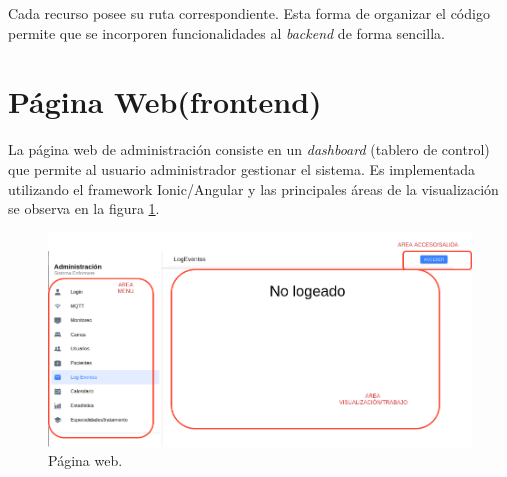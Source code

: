 Cada recurso posee su ruta correspondiente. Esta forma de organizar el código permite que se incorporen funcionalidades al \textit{backend} de forma sencilla.

\pagebreak

\section{Página Web(frontend)}

La página web de administración consiste en un \textit{dashboard} (tablero de control) que permite al usuario administrador gestionar el sistema.
Es implementada utilizando el framework Ionic/Angular y las principales áreas de la visualización se observa en la figura \ref{fig:Página web}.

\begin{figure}[ht]
	\centering
	\includegraphics[scale=.48]{./Figures/pagina-web.png}
	\caption{Página web.}
	\label{fig:Página web}
\end{figure}

